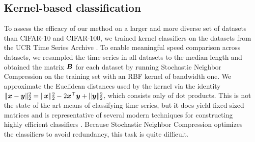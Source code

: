 \subsection{Kernel-based classification}

To assess the efficacy of our method on a larger and more diverse set of datasets than CIFAR-10 and CIFAR-100, we trained kernel classifiers on the datasets from the UCR Time Series Archive \cite{UCRArchive2018}. To enable meaningful speed comparison across datasets, we resampled the time series in all datasets to the median length and obtained the matrix $\bm{B}$ for each dataset by running Stochastic Neighbor Compression \cite{snc} on the training set with an RBF kernel of bandwidth one.
We approximate the Euclidean distances used by the kernel via the identity $\lVert\bm{x} - \bm{y}\rVert_2^2 = \lVert\bm{x}\rVert_2^2 - 2\bm{x}^\top \bm{y} + \lVert\bm{y}\rVert_2^2$, which consists only of dot products.
This is not the state-of-the-art means of classifying time series, but it does yield fixed-sized matrices and is representative of several modern techniques for constructing highly efficient classifiers \cite{snc,dsnc,bnc,protonn}.
Because Stochastic Neighbor Compression optimizes the classifiers to avoid redundancy, this task is quite difficult.

